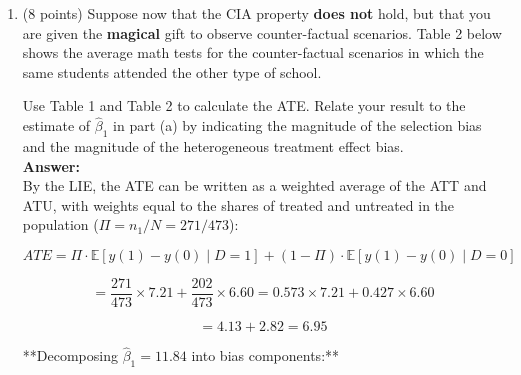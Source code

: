 \documentclass[letterpaper,12pt]{article}
\begin{document}
\begin{enumerate}[label=(\alph*)]
\item (8 points) Suppose now that the CIA property \textbf{does not} hold, but that you are given the \textbf{magical} gift to observe counter-factual scenarios. Table 2 below shows the average math tests for the counter-factual scenarios in which the same students attended the other type of school.  
\begin{table}[H]
\begin{center}
\caption{\textbf{Counterfactuals} Average Score on National Math Test (out of 100)}
\label{table:main_shock_effect}
\end{center}
\captionsetup{width=0.80\textwidth}
\captionsetup{skip=0pt}
\caption*{Notes: Sample sizes are given in brackets}
\end{table}
Use Table 1 and Table 2 to calculate the ATE. Relate your result to the estimate of $\hat{\beta}_1$ in part (a) by indicating the magnitude of the selection bias and the magnitude of the heterogeneous treatment effect bias.  \\
\textbf{Answer:}\\

By the LIE, the ATE can be written as a weighted average of the ATT and ATU, with weights equal to the shares of treated and untreated in the population ($\Pi = n_1/N = 271/473$):

$$ATE = \Pi \cdot \mathbb{E}[y(1)-y(0)\mid D=1] + (1-\Pi) \cdot \mathbb{E}[y(1)-y(0)\mid D=0]$$

$$= \frac{271}{473} \times 7.21 + \frac{202}{473} \times 6.60 = 0.573 \times 7.21 + 0.427 \times 6.60$$

$$= 4.13 + 2.82 = \boxed{6.95}$$

**Decomposing $\hat{\beta}_1 = 11.84$ into bias components:**


\end{enumerate}
\end{document}
